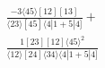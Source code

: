 \documentclass[varwidth, border=5pt]{standalone}
\begin{document}
\begin{my}
$\begin{gathered}
\scriptscriptstyle\frac{-3⟨45⟩[12][13]}{⟨23⟩[45]⟨4|1+5|4]}+\\
\scriptscriptstyle\frac{1[23][12]⟨45⟩^2}{⟨12⟩[24]⟨34⟩⟨4|1+5|4]}\phantom{+}
\end{gathered}$
\end{my}
\end{document}
